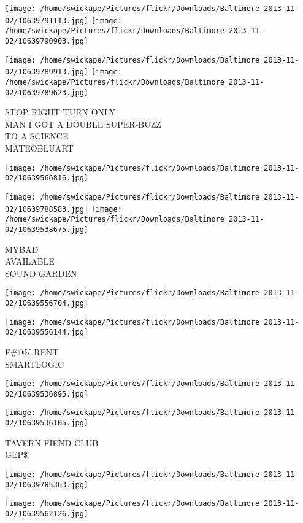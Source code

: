\documentclass[10pt,letterpaper]{article}
\begin{document}
\texttt{[image: /home/swickape/Pictures/flickr/Downloads/Baltimore 2013-11-02/10639791113.jpg]}
\texttt{[image: /home/swickape/Pictures/flickr/Downloads/Baltimore 2013-11-02/10639790903.jpg]}

\texttt{[image: /home/swickape/Pictures/flickr/Downloads/Baltimore 2013-11-02/10639789913.jpg]}
\texttt{[image: /home/swickape/Pictures/flickr/Downloads/Baltimore 2013-11-02/10639789623.jpg]}

STOP RIGHT TURN ONLY\\
MAN I GOT A DOUBLE SUPER{-}BUZZ\\
TO A SCIENCE\\
MATEOBLUART
\pagebreak

\texttt{[image: /home/swickape/Pictures/flickr/Downloads/Baltimore 2013-11-02/10639566816.jpg]}

\vspace{0.25in}
\texttt{[image: /home/swickape/Pictures/flickr/Downloads/Baltimore 2013-11-02/10639788583.jpg]}
\texttt{[image: /home/swickape/Pictures/flickr/Downloads/Baltimore 2013-11-02/10639538675.jpg]}

MYBAD\\
AVAILABLE\\
SOUND GARDEN
\pagebreak

\texttt{[image: /home/swickape/Pictures/flickr/Downloads/Baltimore 2013-11-02/10639556704.jpg]}

\vspace{0.25in}
\texttt{[image: /home/swickape/Pictures/flickr/Downloads/Baltimore 2013-11-02/10639556144.jpg]}

F\#@K RENT\\
SMARTLOGIC
\pagebreak

\texttt{[image: /home/swickape/Pictures/flickr/Downloads/Baltimore 2013-11-02/10639536895.jpg]}

\vspace{0.25in}
\texttt{[image: /home/swickape/Pictures/flickr/Downloads/Baltimore 2013-11-02/10639536105.jpg]}

TAVERN FIEND CLUB\\
GEP\$
\pagebreak

\texttt{[image: /home/swickape/Pictures/flickr/Downloads/Baltimore 2013-11-02/10639785363.jpg]}

\vspace{0.25in}
\texttt{[image: /home/swickape/Pictures/flickr/Downloads/Baltimore 2013-11-02/10639562126.jpg]}
\end{document}
